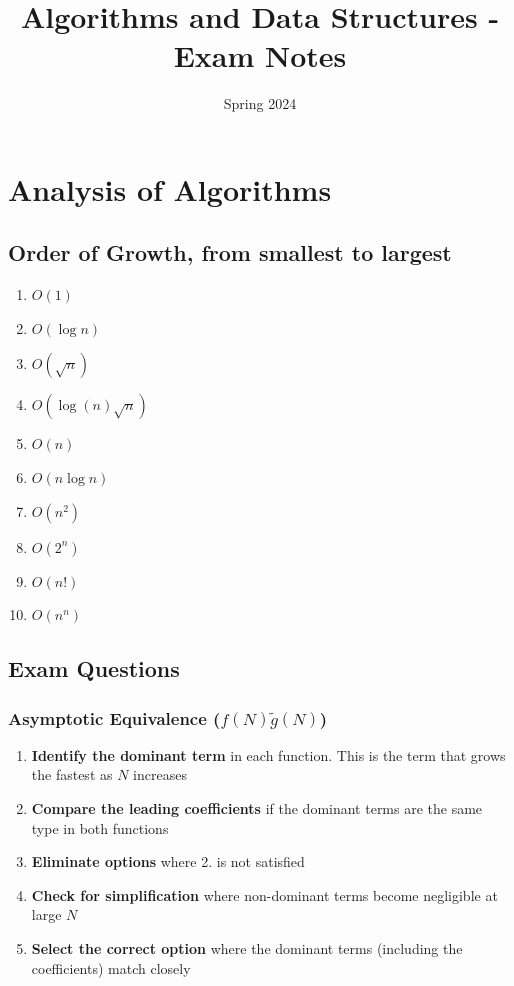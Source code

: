 \documentclass{article}
\title{Algorithms and Data Structures - Exam Notes}
\date{Spring 2024}
\begin{document}
\maketitle

\tableofcontents

\pagebreak

\section{Analysis of Algorithms}

\subsection{Order of Growth, from smallest to largest}

\begin{enumerate}
    \item $O(1)$
    \item $O(\log n)$
    \item $O(\sqrt n)$
    \item $O(\log (n) \sqrt n)$
    \item $O(n)$
    \item $O(n \log n)$
    \item $O(n^2)$
    \item $O(2^n)$
    \item $O(n!)$
    \item $O(n^n)$
\end{enumerate}

\subsection{Exam Questions}

\subsubsection{Asymptotic Equivalence ($f(N) \tilde g(N)$)}

\begin{enumerate}
    \item \textbf{Identify the dominant term} in each function. This is the term that grows the fastest as $N$ increases
    \item \textbf{Compare the leading coefficients} if the dominant terms are the same type in both functions
    \item \textbf{Eliminate options} where 2. is not satisfied
    \item \textbf{Check for simplification} where non-dominant terms become negligible at large $N$
    \item \textbf{Select the correct option} where the dominant terms (including the coefficients) match closely
    
\end{enumerate}
\end{document}
